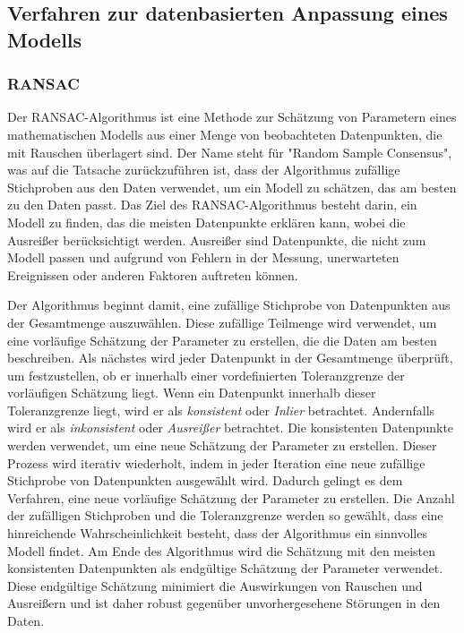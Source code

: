 \subsection{Verfahren zur datenbasierten Anpassung eines Modells}

\subsubsection{RANSAC}
Der RANSAC-Algorithmus ist eine Methode zur Schätzung von Parametern eines mathematischen Modells aus einer Menge von beobachteten Datenpunkten, die mit Rauschen überlagert sind. Der Name steht für "Random Sample Consensus", was auf die Tatsache zurückzuführen ist, dass der Algorithmus zufällige Stichproben aus den Daten verwendet, um ein Modell zu schätzen, das am besten zu den Daten passt. Das Ziel des RANSAC-Algorithmus besteht darin, ein Modell zu finden, das die meisten Datenpunkte erklären kann, wobei die Ausreißer berücksichtigt werden. Ausreißer sind Datenpunkte, die nicht zum Modell passen und aufgrund von Fehlern in der Messung, unerwarteten Ereignissen oder anderen Faktoren auftreten können. \autocite[381-383]{fischler_random_1981}

Der Algorithmus beginnt damit, eine zufällige Stichprobe von Datenpunkten aus der Gesamtmenge auszuwählen. Diese zufällige Teilmenge wird verwendet, um eine vorläufige Schätzung der Parameter zu erstellen, die die Daten am besten beschreiben. Als nächstes wird jeder Datenpunkt in der Gesamtmenge überprüft, um festzustellen, ob er innerhalb einer vordefinierten Toleranzgrenze der vorläufigen Schätzung liegt. Wenn ein Datenpunkt innerhalb dieser Toleranzgrenze liegt, wird er als \textit{konsistent} oder \textit{Inlier} betrachtet. Andernfalls wird er als \textit{inkonsistent} oder \textit{Ausreißer} betrachtet. Die konsistenten Datenpunkte werden verwendet, um eine neue Schätzung der Parameter zu erstellen. Dieser Prozess wird iterativ wiederholt, indem in jeder Iteration eine neue zufällige Stichprobe von Datenpunkten ausgewählt wird. Dadurch gelingt es dem Verfahren, eine neue vorläufige Schätzung der Parameter zu erstellen. Die Anzahl der zufälligen Stichproben und die Toleranzgrenze werden so gewählt, dass eine hinreichende Wahrscheinlichkeit besteht, dass der Algorithmus ein sinnvolles Modell findet. Am Ende des Algorithmus wird die Schätzung mit den meisten konsistenten Datenpunkten als endgültige Schätzung der Parameter verwendet. Diese endgültige Schätzung minimiert die Auswirkungen von Rauschen und Ausreißern und ist daher robust gegenüber unvorhergesehene Störungen in den Daten. \autocite[383-384]{fischler_random_1981} \autocite[3]{martinez-otzeta_ransac_2023}

